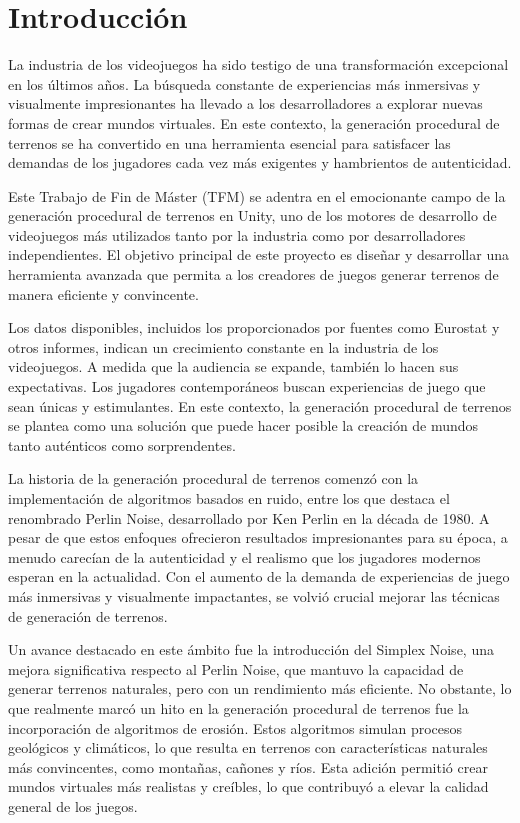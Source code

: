 
\section{Introducción}

La industria de los videojuegos ha sido testigo de una transformación excepcional en los últimos años. La búsqueda constante de experiencias más inmersivas y visualmente impresionantes ha llevado a los desarrolladores a explorar nuevas formas de crear mundos virtuales. En este contexto, la generación procedural de terrenos se ha convertido en una herramienta esencial para satisfacer las demandas de los jugadores cada vez más exigentes y hambrientos de autenticidad.

Este Trabajo de Fin de Máster (TFM) se adentra en el emocionante campo de la generación procedural de terrenos en Unity, uno de los motores de desarrollo de videojuegos más utilizados tanto por la industria como por desarrolladores independientes. El objetivo principal de este proyecto es diseñar y desarrollar una herramienta avanzada que permita a los creadores de juegos generar terrenos de manera eficiente y convincente.

Los datos disponibles, incluidos los proporcionados por fuentes como Eurostat y otros informes, indican un crecimiento constante en la industria de los videojuegos. A medida que la audiencia se expande, también lo hacen sus expectativas. Los jugadores contemporáneos buscan experiencias de juego que sean únicas y estimulantes. En este contexto, la generación procedural de terrenos se plantea como una solución que puede hacer posible la creación de mundos tanto auténticos como sorprendentes.

La historia de la generación procedural de terrenos comenzó con la implementación de algoritmos basados en ruido, entre los que destaca el renombrado Perlin Noise, desarrollado por Ken Perlin en la década de 1980. A pesar de que estos enfoques ofrecieron resultados impresionantes para su época, a menudo carecían de la autenticidad y el realismo que los jugadores modernos esperan en la actualidad. Con el aumento de la demanda de experiencias de juego más inmersivas y visualmente impactantes, se volvió crucial mejorar las técnicas de generación de terrenos.

Un avance destacado en este ámbito fue la introducción del Simplex Noise, una mejora significativa respecto al Perlin Noise, que mantuvo la capacidad de generar terrenos naturales, pero con un rendimiento más eficiente. No obstante, lo que realmente marcó un hito en la generación procedural de terrenos fue la incorporación de algoritmos de erosión. Estos algoritmos simulan procesos geológicos y climáticos, lo que resulta en terrenos con características naturales más convincentes, como montañas, cañones y ríos. Esta adición permitió crear mundos virtuales más realistas y creíbles, lo que contribuyó a elevar la calidad general de los juegos.

